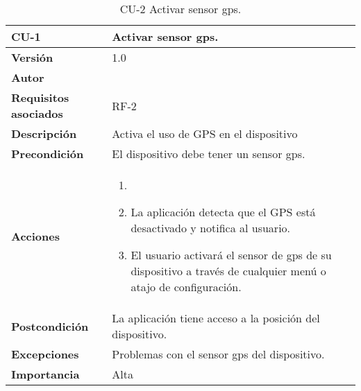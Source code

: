 \begin{table}[p]
	\centering
	\begin{tabularx}{\linewidth}{ p{} p{} }
		\toprule
		\textbf{CU-1}    & \textbf{Activar sensor \acrshort{gps}.}\\
		\toprule
		\textbf{Versión}              & 1.0    \\
		\textbf{Autor}                & \autor \\
		\textbf{Requisitos asociados} & RF-2 \\
		\textbf{Descripción}          & Activa el uso de GPS en el dispositivo \\
		\textbf{Precondición}         & El dispositivo debe tener un sensor \acrshort{gps}. \\
		\textbf{Acciones}             &
		\begin{enumerate}
			\def\labelenumi{\arabic{enumi}.}
			\tightlist
			\item \item La aplicación detecta que el GPS está desactivado y notifica al usuario.
			\item El usuario activará el sensor de \acrshort{gps} de su dispositivo a través de cualquier menú o atajo de configuración.
		\end{enumerate}\\
		\textbf{Postcondición}        & La aplicación tiene acceso a la posición del dispositivo. \\
		\textbf{Excepciones}          & Problemas con el sensor \acrshort{gps} del dispositivo. \\
		\textbf{Importancia}          & Alta \\
		\bottomrule
	\end{tabularx}
	\caption{CU-2 Activar sensor \acrshort{gps}.}
\end{table}

